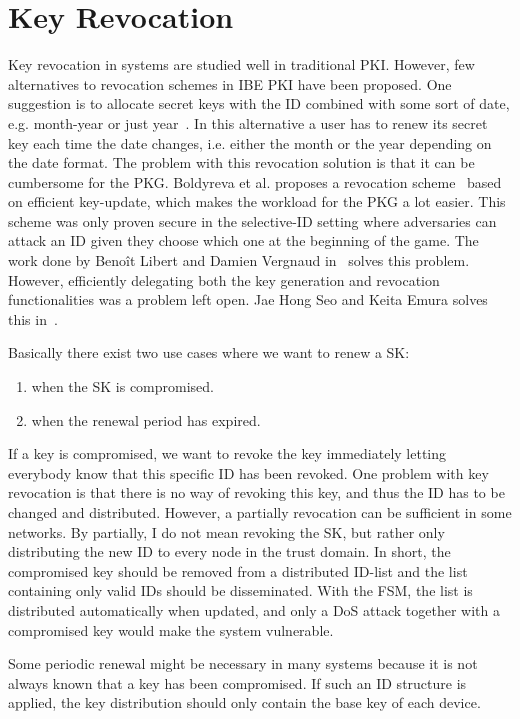 \section{Key Revocation}
Key revocation in systems are studied well in traditional \gls{PKI}.
However, few alternatives to revocation schemes in \gls{IBE} \gls{PKI} have been proposed.
One suggestion is to allocate secret keys with the \gls{ID} combined with some sort of date, e.g. month-year or just year~\cite[section 1.1.1]{DBLP:conf/crypto/BonehF01}. 
In this alternative a user has to renew its secret key each time the date changes, i.e. either the month or the year depending on the date format.
The problem with this revocation solution is that it can be cumbersome for the \gls{PKG}.
Boldyreva et al. proposes a revocation scheme~\cite{DBLP:journals/iacr/BoldyrevaGK12} based on efficient key-update, which makes the workload for the \gls{PKG} a lot easier. 
This scheme was only proven secure in the selective-ID setting where adversaries can attack an \gls{ID} given they choose which one at the beginning of the game.
The work done by Beno\^{i}t Libert and Damien Vergnaud in~\cite{DBLP:conf/ctrsa/LibertV09} solves this problem. 
However, efficiently delegating both the key generation and revocation functionalities was a problem left open.
Jae Hong Seo and Keita Emura solves this in~\cite{DBLP:journals/iacr/SeoE13a}.

Basically there exist two use cases where we want to renew a \gls{SK}: 
\begin{enumerate}
  \item when the \gls{SK} is compromised.
  \item when the renewal period has expired.
\end{enumerate}
If a key is compromised, we want to revoke the key immediately letting everybody know that this specific \gls{ID} has been revoked. 
One problem with key revocation is that there is no way of revoking this key, and thus the \gls{ID} has to be changed and distributed. 
However, a partially revocation can be sufficient in some networks. 
By partially, I do not mean revoking the \gls{SK}, but rather only distributing the new \gls{ID} to every node in the trust domain.
In short, the compromised key should be removed from a distributed ID-list and the list containing only valid \gls{ID}s should be disseminated.
With the \gls{FSM}, the list is distributed automatically when updated, and only a \gls{DoS} attack together with a compromised key would make the system vulnerable. 

Some periodic renewal might be necessary in many systems because it is not always known that a key has been compromised.
If such an \gls{ID} structure is applied, the key distribution should only contain the base key of each device. 